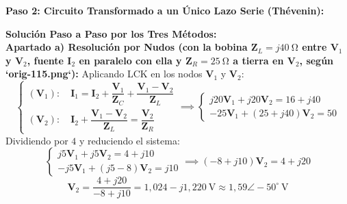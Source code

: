 \begin{ejercicio}
\textbf{Paso 2: Circuito Transformado a un Único Lazo Serie (Thévenin):}\\[4pt]
\begin{center}
\end{center}

\textbf{Solución Paso a Paso por los Tres Métodos:}\\[4pt]
\textbf{Apartado a) Resolución por Nudos (con la bobina $\mathbf{Z}_L = j40\ \si{\ohm}$ entre $\mathbf{V}_1$ y $\mathbf{V}_2$, fuente $\mathbf{I}_2$ en paralelo con ella y $\mathbf{Z}_R = 25\ \si{\ohm}$ a tierra en $\mathbf{V}_2$, según `orig-115.png`):}
Aplicando LCK en los nodos $\mathbf{V}_1$ y $\mathbf{V}_2$:
\begin{equation}
    \begin{cases}
        (\mathbf{V}_1):\quad \mathbf{I}_1 = \mathbf{I}_2 + \dfrac{\mathbf{V}_1}{\mathbf{Z}_C} + \dfrac{\mathbf{V}_1 - \mathbf{V}_2}{\mathbf{Z}_L} \\[8pt]
        (\mathbf{V}_2):\quad \mathbf{I}_2 + \dfrac{\mathbf{V}_1 - \mathbf{V}_2}{\mathbf{Z}_L} = \dfrac{\mathbf{V}_2}{\mathbf{Z}_R}
    \end{cases}
    \implies
    \begin{cases}
        j20 \mathbf{V}_1 + j20 \mathbf{V}_2 = 16 + j40 \\
        -25 \mathbf{V}_1 + (25 + j40) \mathbf{V}_2 = 50
    \end{cases}
\end{equation}
Dividiendo por $4$ y reduciendo el sistema:
\begin{equation}
    \begin{cases}
        j5 \mathbf{V}_1 + j5 \mathbf{V}_2 = 4 + j10 \\
        -j5 \mathbf{V}_1 + (j5 - 8) \mathbf{V}_2 = j10
    \end{cases}
    \implies (-8 + j10) \mathbf{V}_2 = 4 + j20
\end{equation}
\begin{equation}
    \boxed{\mathbf{V}_2 = \frac{4 + j20}{-8 + j10} = 1{,}024 - j1{,}220\ \si{\volt} \approx 1{,}59\angle -50^\circ\ \si{\volt}}
\end{equation}


\end{ejercicio}
